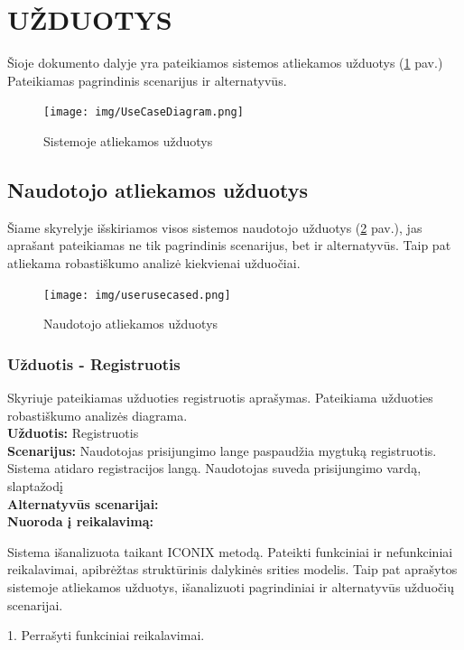 \documentclass{VUMIFPSkursinis}
\begin{document}
\newpage
\section{UŽDUOTYS}
Šioje dokumento dalyje yra pateikiamos sistemos atliekamos užduotys  (\ref{fig:usecase} pav.) Pateikiamas pagrindinis scenarijus ir alternatyvūs.\\
\begin{figure}[H]
\centering
\texttt{[image: img/UseCaseDiagram.png]}
\label{fig:usecase}
\caption{Sistemoje atliekamos užduotys}
\end{figure}

\subsection{Naudotojo atliekamos užduotys}
Šiame skyrelyje išskiriamos visos sistemos naudotojo užduotys (\ref{fig:usercd} pav.), jas aprašant pateikiamas ne tik pagrindinis scenarijus, bet ir alternatyvūs. Taip pat atliekama robastiškumo analizė kiekvienai užduočiai.

\begin{figure}[H]
\centering
\texttt{[image: img/userusecased.png]}
\label{fig:usercd}
\caption{Naudotojo atliekamos užduotys}
\end{figure}

\subsubsection{Užduotis - Registruotis}
Skyriuje pateikiamas užduoties registruotis aprašymas. Pateikiama užduoties robastiškumo analizės diagrama.\\
\textbf{Užduotis:}  Registruotis \\
\textbf{Scenarijus:} Naudotojas prisijungimo lange paspaudžia mygtuką registruotis. Sistema atidaro registracijos langą. Naudotojas suveda prisijungimo vardą, slaptažodį  \\
\textbf{Alternatyvūs scenarijai:} \\
\textbf{Nuoroda į reikalavimą: } 


\newpage

Sistema išanalizuota taikant ICONIX metodą. Pateikti funkciniai ir nefunkciniai reikalavimai, apibrėžtas struktūrinis dalykinės srities modelis. Taip pat aprašytos sistemoje atliekamos užduotys, išanalizuoti pagrindiniai ir alternatyvūs užduočių scenarijai.
\newpage

1. Perrašyti funkciniai reikalavimai.
\end{document}
